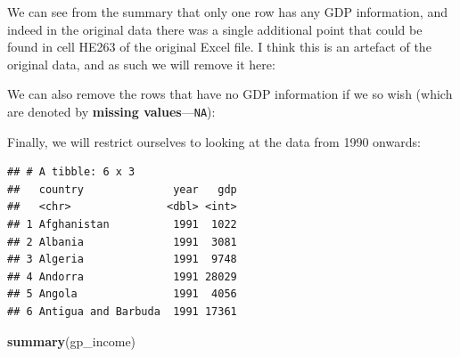 \documentclass[]{book}
\newenvironment{Shaded}{\begin{snugshade}}{\end{snugshade}}
\newcommand{\KeywordTok}[1]{\textcolor[rgb]{0.13,0.29,0.53}{\textbf{{#1}}}}
\newcommand{\DecValTok}[1]{\textcolor[rgb]{0.00,0.00,0.81}{{#1}}}
\newcommand{\StringTok}[1]{\textcolor[rgb]{0.31,0.60,0.02}{{#1}}}
\newcommand{\NormalTok}[1]{{#1}}
\theoremstyle{definition}
\theoremstyle{definition}
\theoremstyle{definition}
\theoremstyle{remark}
\begin{document}
We can see from the summary that only one row has any GDP information,
and indeed in the original data there was a single additional point that
could be found in cell HE263 of the original Excel file. I think this is
an artefact of the original data, and as such we will remove it here:

\begin{Shaded}
\end{Shaded}

We can also remove the rows that have no GDP information if we so wish
(which are denoted by \textbf{missing values}---\texttt{NA}):

\begin{Shaded}
\end{Shaded}

Finally, we will restrict ourselves to looking at the data from 1990
onwards:

\begin{Shaded}
\end{Shaded}

\begin{verbatim}
## # A tibble: 6 x 3
##   country              year   gdp
##   <chr>               <dbl> <int>
## 1 Afghanistan          1991  1022
## 2 Albania              1991  3081
## 3 Algeria              1991  9748
## 4 Andorra              1991 28029
## 5 Angola               1991  4056
## 6 Antigua and Barbuda  1991 17361
\end{verbatim}

\begin{Shaded}
\begin{Highlighting}[]
\KeywordTok{summary}\NormalTok{(gp_income)}
\end{Highlighting}
\end{Shaded}
\end{document}
